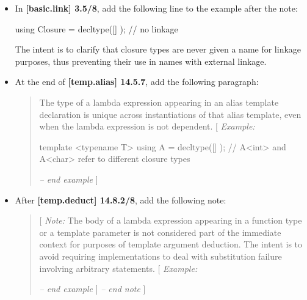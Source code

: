\documentclass[11pt]{article}
\begin{document}
\begin{itemize}
    \item In \textbf{[basic.link] 3.5/8}, add the following line to the example
          after the note:
    \begin{cpp}
        using Closure = decltype([] {}); // no linkage
    \end{cpp}
    The intent is to clarify that closure types are never given a name for
    linkage purposes, thus preventing their use in names with external linkage.

    \item At the end of \textbf{[temp.alias] 14.5.7}, add the following paragraph:
    \begin{quote}
        The type of a lambda expression appearing in an alias template declaration
        is unique across instantiations of that alias template, even when the
        lambda expression is not dependent.
        [ \textit{Example:}
\begin{cpp}
template <typename T>
using A = decltype([] {});
// A<int> and A<char> refer to different closure types
\end{cpp}
        \textit{-- end example} ]
    \end{quote}

    \item After \textbf{[temp.deduct] 14.8.2/8}, add the following note:
    \begin{quote}
        [ \textit{Note:} The body of a lambda expression appearing in a function
        type or a template parameter is not considered part of the immediate
        context for purposes of template argument deduction. The intent is to
        avoid requiring implementations to deal with substitution failure
        involving arbitrary statements. [ \textit{Example:}
        \textit{-- end example} ]
        \textit{-- end note} ]
    \end{quote}


\end{itemize}
\end{document}
